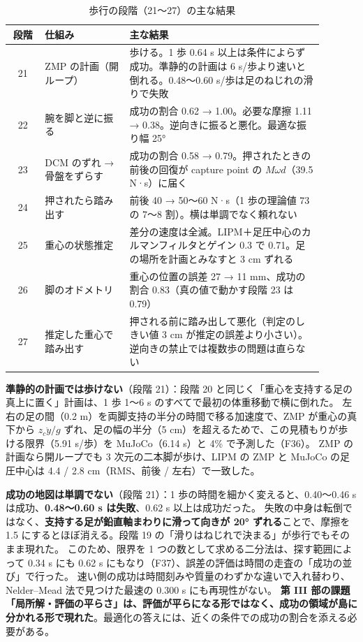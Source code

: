 \documentclass[paper=a4paper,fontsize=10pt,twocolumn,column_gap=2zw,line_length=24zw,number_of_lines=46,head_space=20mm]{jlreq}
\begin{document}
\begin{table}[t]\centering\small
\caption{歩行の段階（21〜27）の主な結果}\label{tab:walk}
\setlength{\tabcolsep}{2pt}
\begin{tabular}{@{}cp{0.27\linewidth}p{0.62\linewidth}@{}}\toprule
段階 & 仕組み & 主な結果 \\\midrule
21 & ZMP の計画（開ループ） & 歩ける。1 歩 0.64 s 以上は条件によらず成功。準静的の計画は 6 s/歩より速いと倒れる。0.48〜0.60 s/歩は足のねじれの滑りで失敗 \\
22 & 腕を脚と逆に振る & 成功の割合 0.62 → 1.00。必要な摩擦 1.11 → 0.38。逆向きに振ると悪化。最適な振り幅 25° \\
23 & DCM のずれ → 骨盤をずらす & 成功の割合 0.58 → 0.79。押されたときの前後の回復が capture point の $M\omega d$（39.5 N·s）に届く \\
24 & 押されたら踏み出す & 前後 40 → 50〜60 N·s（1 歩の理論値 73 の 7〜8 割）。横は単調でなく頼れない \\
25 & 重心の状態推定 & 差分の速度は全滅。LIPM＋足圧中心のカルマンフィルタとゲイン 0.3 で 0.71。足の場所を計画とみなすと 3 cm ずれる \\
26 & 脚のオドメトリ & 重心の位置の誤差 27 → 11 mm、成功の割合 0.83（真の値で動かす段階 23 は 0.79） \\
27 & 推定した重心で踏み出す & 押される前に踏み出して悪化（判定のしきい値 3 cm が推定の誤差より小さい）。逆向きの禁止では複数歩の問題は直らない \\\bottomrule
\end{tabular}
\end{table}

\textbf{準静的の計画では歩けない}（段階 21）：段階 20 と同じく「重心を支持する足の真上に置く」計画は、1 歩 1〜6 s のすべてで最初の体重移動で横に倒れた。
左右の足の間（0.2 m）を両脚支持の半分の時間で移る加速度で、ZMP が重心の真下から $z_c\ddot{y}/g$ ずれ、足の幅の半分（5 cm）を超えるためで、この見積もりが歩ける限界（5.91 s/歩）を MuJoCo（6.14 s）と 4\% で予測した（F36）。
ZMP の計画なら開ループでも 3 次元の二本脚が歩け、LIPM の ZMP と MuJoCo の足圧中心は 4.4 / 2.8 cm（RMS、前後 / 左右）で一致した。

\textbf{成功の地図は単調でない}（段階 21）：1 歩の時間を細かく変えると、0.40〜0.46 s は成功、\textbf{0.48〜0.60 s は失敗}、0.62 s 以上は成功だった。
失敗の中身は転倒ではなく、\textbf{支持する足が鉛直軸まわりに滑って向きが 20° ずれる}ことで、摩擦を 1.5 にするとほぼ消える。段階 19 の「滑りはねじれで決まる」が歩行でもそのまま現れた。
このため、限界を 1 つの数として求める二分法は、探す範囲によって 0.34 s にも 0.62 s にもなり（F37）、誤差の評価は時間の走査の「成功の並び」で行った。
速い側の成功は時間刻みや質量のわずかな違いで入れ替わり、Nelder--Mead 法で見つけた最速の 0.300 s にも再現性がない。
\textbf{第 III 部の課題「局所解・評価の平らさ」は、評価が平らになる形ではなく、成功の領域が島に分かれる形で現れた}。最適化の答えには、近くの条件での成功の割合を添える必要がある。
\end{document}
